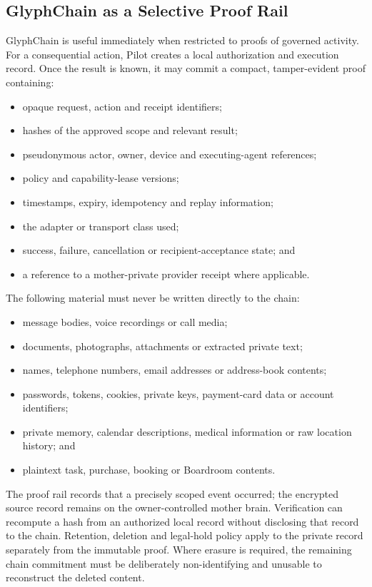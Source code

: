 \subsection{GlyphChain as a Selective Proof Rail}

GlyphChain is useful immediately when restricted to proofs of governed activity.
For a consequential action, Pilot creates a local authorization and execution
record. Once the result is known, it may commit a compact, tamper-evident proof
containing:

\begin{itemize}
  \item opaque request, action and receipt identifiers;
  \item hashes of the approved scope and relevant result;
  \item pseudonymous actor, owner, device and executing-agent references;
  \item policy and capability-lease versions;
  \item timestamps, expiry, idempotency and replay information;
  \item the adapter or transport class used;
  \item success, failure, cancellation or recipient-acceptance state; and
  \item a reference to a mother-private provider receipt where applicable.
\end{itemize}

The following material must never be written directly to the chain:

\begin{itemize}
  \item message bodies, voice recordings or call media;
  \item documents, photographs, attachments or extracted private text;
  \item names, telephone numbers, email addresses or address-book contents;
  \item passwords, tokens, cookies, private keys, payment-card data or account
        identifiers;
  \item private memory, calendar descriptions, medical information or raw
        location history; and
  \item plaintext task, purchase, booking or Boardroom contents.
\end{itemize}

The proof rail records that a precisely scoped event occurred; the encrypted
source record remains on the owner-controlled mother brain. Verification can
recompute a hash from an authorized local record without disclosing that record
to the chain. Retention, deletion and legal-hold policy apply to the private
record separately from the immutable proof. Where erasure is required, the
remaining chain commitment must be deliberately non-identifying and unusable to
reconstruct the deleted content.

